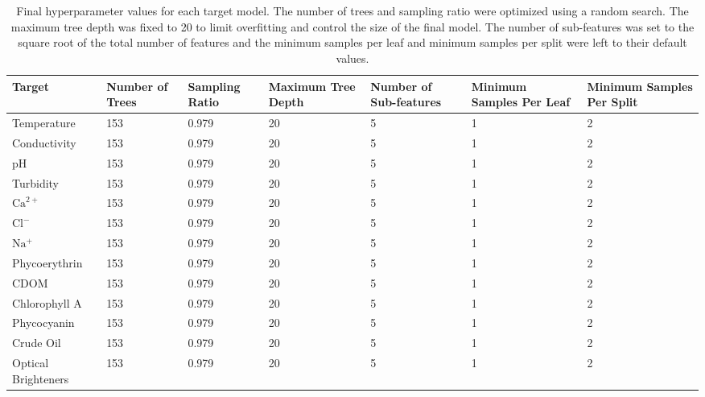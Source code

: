 \documentclass[remotesensing,article,submit,pdftex,moreauthors]{Definitions/mdpi}
\begin{document}
\section[\appendixname~\thesection]{}\label{Model Hyperparameters}
\begin{table}[H] 
\caption{Final hyperparameter values for each target model. The number of trees and sampling ratio were optimized using a random search. The maximum tree depth was fixed to 20 to limit overfitting and control the size of the final model. The number of sub-features was set to the square root of the total number of features and the minimum samples per leaf and minimum samples per split were left to their default values. \label{tab:hyperparameters}}
\begin{tabularx}{\textwidth}{CCCCCCC}
\toprule
\textbf{Target}	& \textbf{Number of Trees}	& \textbf{Sampling Ratio} & \textbf{Maximum Tree Depth} & \textbf{Number of Sub-features} & \textbf{Minimum Samples Per Leaf} & \textbf{Minimum Samples Per Split}\\
\midrule
Temperature & 153 & 0.979 & 20 & 5 & 1 & 2 \\
Conductivity & 153 & 0.979 & 20 & 5 & 1 & 2\\
pH & 153 & 0.979 & 20 & 5 & 1 & 2\\
Turbidity & 153 & 0.979 & 20 & 5 & 1 & 2\\
$\mathrm{Ca}^{2+}$ & 153 & 0.979 & 20 & 5 & 1 & 2\\
$\mathrm{Cl^-}$ & 153 & 0.979 & 20 & 5 & 1 & 2\\
$\mathrm{Na^+}$ & 153 & 0.979 & 20 & 5 & 1 & 2\\
Phycoerythrin & 153 & 0.979 & 20 & 5 & 1 & 2\\
CDOM & 153 & 0.979 & 20 & 5 & 1 & 2\\
Chlorophyll A & 153 & 0.979 & 20 & 5 & 1 & 2\\
Phycocyanin & 153 & 0.979 & 20 & 5 & 1 & 2\\
Crude Oil & 153 & 0.979 & 20 & 5 & 1 & 2\\
Optical Brighteners & 153 & 0.979 & 20 & 5 & 1 & 2\\
\bottomrule
\end{tabularx}
\end{table}
\end{document}

